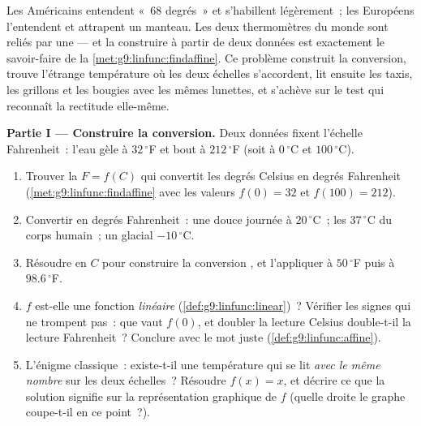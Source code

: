 \begin{problem}
\label{pb:g9:linfunc:1}
Les Américains entendent «~$68$ degrés~» et s'habillent légèrement~;
les Européens l'entendent et attrapent un manteau. Les deux
thermomètres du monde sont reliés par une  --- et la
construire à partir de deux données est exactement le savoir-faire
de la \cref{met:g9:linfunc:findaffine}. Ce problème construit la
conversion, trouve l'étrange température où les deux échelles
s'accordent, lit ensuite les taxis, les grillons et les bougies avec
les mêmes lunettes, et s'achève sur le test qui reconnaît la
rectitude elle-même.

\medskip
\noindent\textbf{Partie I --- Construire la conversion.}
Deux données fixent l'échelle Fahrenheit~: l'eau gèle à
$32\,^\circ$F et bout à $212\,^\circ$F (soit à $0\,^\circ$C et
$100\,^\circ$C).
\begin{enumerate}
  \item Trouver la  $F = f(C)$ qui convertit les
        degrés Celsius en degrés Fahrenheit
        (\cref{met:g9:linfunc:findaffine} avec les valeurs
        $f(0) = 32$ et $f(100) = 212$).
  \item Convertir en degrés Fahrenheit~: une douce journée à
        $20\,^\circ$C~; les $37\,^\circ$C du corps humain~; un
        glacial $-10\,^\circ$C.
  \item Résoudre en $C$ pour construire la conversion , et
        l'appliquer à $50\,^\circ$F puis à $98.6\,^\circ$F.
  \item $f$ est-elle une fonction \emph{linéaire}
        (\cref{def:g9:linfunc:linear})~? Vérifier les signes qui ne
        trompent pas~: que vaut $f(0)$, et doubler la lecture
        Celsius double-t-il la lecture Fahrenheit~? Conclure avec le
        mot juste (\cref{def:g9:linfunc:affine}).
  \item L'énigme classique~: existe-t-il une température qui se lit
        \emph{avec le même nombre} sur les deux échelles~? Résoudre
        $f(x) = x$, et décrire ce que la solution signifie sur la
        représentation graphique de $f$ (quelle droite le graphe
        coupe-t-il en ce point~?).
\end{enumerate}


\end{problem}
